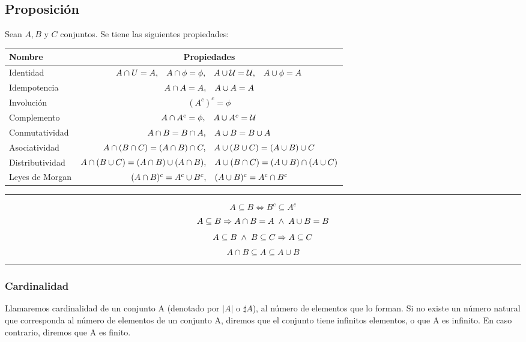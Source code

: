 \subsection{Proposición}
Sean $A, B$ y $C$ conjuntos. Se tiene las siguientes propiedades:
\begingroup
\setlength{\tabcolsep}{5pt} %
\renewcommand{\arraystretch}{1.5} %
\begin{center}
\begin{tabular}{l|c}
\bf Nombre&\bf Propiedades\\ \hline
Identidad&$A \cap U = A,\hspace{0.3cm} A \cap \phi = \phi, \hspace{0.3cm} A \cup \mathcal{U} = \mathcal{U}, \hspace{0.3cm} A \cup \phi = A$\\
Idempotencia&$A \cap A = A, \hspace{0.3cm} A \cup A = A$\\
Involución&$(A^c)^c = \phi$\\
Complemento&$A \cap A^c = \phi, \hspace{0.3cm} A \cup A^c = \mathcal{U}$\\
Conmutatividad&$A \cap B = B \cap A, \hspace{0.3cm} A \cup B = B \cup A $\\
Asociatividad&$ A \cap (B \cap C) = (A \cap B) \cap C, \hspace{0.3cm} A \cup (B \cup C) = (A \cup B) \cup C $\\
Distributividad&$A \cap (B \cup C) = (A \cap B) \cup (A \cap B), \hspace{0.3cm} A \cup (B \cap C) = (A \cup B) \cap (A \cup C)$\\
Leyes de Morgan&$(A \cap B)^c = A^c \cup B^c, \hspace{0.3cm} (A \cup B)^c = A^c \cap B^c$
\end{tabular}
\end{center}
\endgroup

\hrule
$$A \subseteq B \Leftrightarrow B^c \subseteq A^c$$
$$A \subseteq B \Rightarrow A \cap B = A  \hspace{0.1cm} \wedge \hspace{0.1cm}  A \cup B =B$$
$$A \subseteq B \hspace{0.1cm} \wedge \hspace{0.1cm} B \subseteq C \Rightarrow A \subseteq C$$
$$A \cap B \subseteq A \subseteq A \cup B$$
\hrule

\subsubsection{Cardinalidad}
Llamaremos cardinalidad de un conjunto A (denotado por $|A|$ o $\sharp A$), al número de elementos que lo forman. Si no existe un número natural que corresponda al número de elementos de un conjunto A, diremos que el conjunto tiene infinitos elementos, o que A es infinito. En caso contrario, diremos que A es finito.


